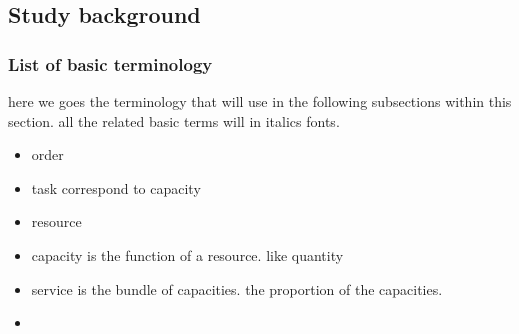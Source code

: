 










\subsection{Study background} %
\label{sub:background}


\subsubsection{List of basic terminology} %
\label{sub:list_of_basic_terminology}
here we goes the terminology that will use in the following subsections within this section. all the related basic terms will in italics fonts.
\begin{itemize}
	\item order
	\item task correspond to capacity
	\item resource
	\item capacity is the function of a resource. like quantity
	\item service is the bundle of capacities. the proportion of the capacities.
	\item 
\end{itemize}

